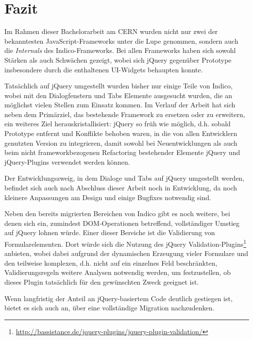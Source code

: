 \chapter{Fazit}

Im Rahmen dieser Bachelorarbeit am CERN wurden nicht nur zwei der bekanntesten JavaScript-Frameworks
unter die Lupe genommen, sondern auch die \emph{Internals} des Indico-Frameworks. Bei allen
Frameworks haben sich sowohl Stärken als auch Schwächen gezeigt, wobei sich jQuery gegenüber
Prototype insbesondere durch die enthaltenen UI-Widgets behaupten konnte.

Tatsächlich auf jQuery umgestellt wurden bisher nur einige Teile von Indico, wobei mit den
Dialogfenstern und Tabs Elemente ausgesucht wurden, die an möglichst vielen Stellen zum Einsatz
kommen. Im Verlauf der Arbeit hat sich neben dem Primärziel, das bestehende Framework zu ersetzen
oder zu erweitern, ein weiteres Ziel herauskristallisiert: jQuery so früh wie möglich, d.h. sobald
Prototype entfernt und Konflikte behoben waren, in die von allen Entwicklern genutzten Version zu
integrieren, damit sowohl bei Neuentwicklungen als auch beim nicht frameworkbezogenen Refactoring
bestehender Elemente jQuery und jQuery-Plugins verwendet werden können.

Der Entwicklungszweig, in dem Dialoge und Tabs auf jQuery umgestellt werden, befindet sich auch nach
Abschluss dieser Arbeit noch in Entwicklung, da noch kleinere Anpassungen am Design und einige
Bugfixes notwendig sind.

Neben den bereits migrierten Bereichen von Indico gibt es noch weitere, bei denen sich ein,
zumindest DOM-Operationen betreffend, vollständiger Umstieg auf jQuery lohnen würde. Einer dieser
Bereiche ist die Validierung von Formularelementen. Dort würde sich die Nutzung des jQuery
Validation-Plugins\footnote{\href{http://bassistance.de/jquery-plugins/jquery-plugin-validation/}{http://bassistance.de/jquery-plugins/jquery-plugin-validation/}}
anbieten, wobei dabei aufgrund der dynamischen Erzeugung vieler Formulare und den teilweise
komplexen, d.h. nicht auf ein einzelnes Feld beschränkten, Validierungsregeln weitere Analysen
notwendig werden, um festzustellen, ob dieses Plugin tatsächlich für den gewünschten Zweck geeignet
ist.

Wenn langfristig der Anteil an jQuery-basiertem Code deutlich gestiegen ist, bietet es sich auch an,
über eine vollständige Migration nachzudenken.
